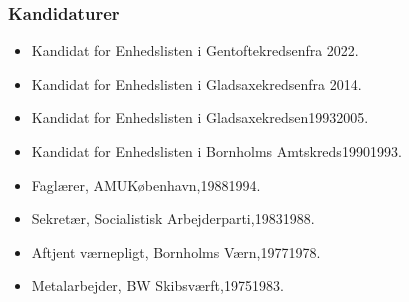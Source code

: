 \documentclass[11pt, a4paper]{awesome-cv}
\begin{document}
\begin{cvletter}
\subsubsection*{Kandidaturer}
\begin{itemize}
\item Kandidat for Enhedslisten i Gentoftekredsenfra 2022.
\item Kandidat for Enhedslisten i Gladsaxekredsenfra 2014.
\item Kandidat for Enhedslisten i Gladsaxekredsen19932005.
\item Kandidat for Enhedslisten i Bornholms Amtskreds19901993.
\end{itemize}
\begin{itemize}
\item Faglærer, AMUKøbenhavn,19881994.
\item Sekretær, Socialistisk Arbejderparti,19831988.
\item Aftjent værnepligt, Bornholms Værn,19771978.
\item Metalarbejder, BW Skibsværft,19751983.
\end{itemize}
\end{cvletter}
\end{document}

